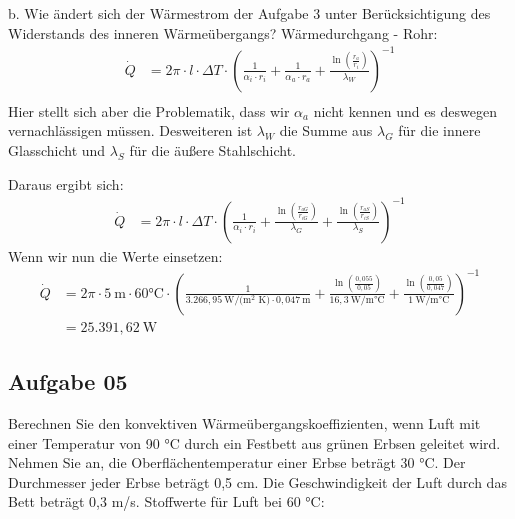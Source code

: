 \documentclass[a4paper,10pt]{article}
\begin{document}
\pagebreak

b. Wie ändert sich der Wärmestrom der Aufgabe 3 unter Berücksichtigung des
Widerstands des inneren Wärmeübergangs? \pp
Wärmedurchgang - Rohr:
\begin{align*}
\dot{Q} &= 2 \pi \cdot l \cdot \Delta T \cdot \left( \frac{1}{\alpha_i \cdot r_i} + \frac{1}{\alpha_a \cdot r_a} + \frac{\ln(\frac{r_a}{r_i})}{\lambda_W} \right)^{-1} \\
\end{align*}
Hier stellt sich aber die Problematik, dass wir $\alpha_a$ nicht kennen und es deswegen vernachlässigen müssen. Desweiteren ist $\lambda_W$ die Summe aus $\lambda_G$ für die innere Glasschicht und $\lambda_S$ für die äußere Stahlschicht. \par 
Daraus ergibt sich:
\begin{align*}
\dot{Q} &= 2 \pi \cdot l \cdot \Delta T \cdot \left( \frac{1}{\alpha_i \cdot r_i} +  \frac{\ln(\frac{r_{aG}}{r_{iG}})}{\lambda_G} +  \frac{\ln(\frac{r_{aS}}{r_{iS}})}{\lambda_S} \right)^{-1}
\end{align*}
Wenn wir nun die Werte einsetzen: 
\begin{align*}
\dot{Q} &= 2 \pi \cdot 5~ \text{m} \cdot 60\text{°C} \cdot \left( \frac{1}{3.266,95 ~ \text{W/(m$^2$ K)} \cdot 0,047 ~ \text{m}} +  \frac{\ln(\frac{0,055}{0,05})}{16,3~ \text{W/m°C}} + \frac{\ln(\frac{0,05}{0,047})}{1~ \text{W/m°C}} \right)^{-1} \\
 &= 25.391,62~ \text{W}
\end{align*}

\pp


\pagebreak
\subsection*{Aufgabe 05}
Berechnen Sie den konvektiven Wärmeübergangskoeffizienten, wenn Luft mit einer
Temperatur von 90 °C durch ein Festbett aus grünen Erbsen geleitet wird. Nehmen Sie
an, die Oberflächentemperatur einer Erbse beträgt 30 °C. Der Durchmesser jeder Erbse
beträgt 0,5 cm. Die Geschwindigkeit der Luft durch das Bett beträgt 0,3 m/s.
\pp
Stoffwerte für Luft bei 60 °C:
\pp
{} \pp
\end{document}
